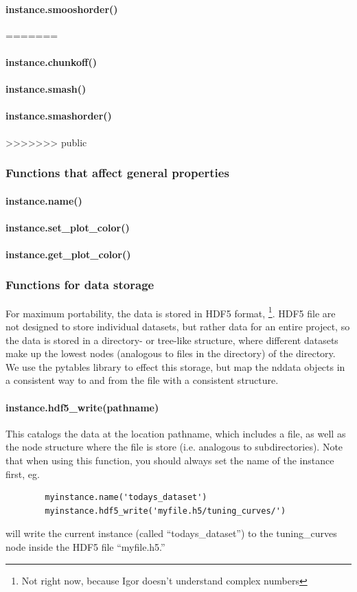 \paragraph{instance.smooshorder()}
=======
\paragraph{instance.chunkoff()}
\paragraph{instance.smash()}
\paragraph{instance.smashorder()}
>>>>>>> public
\subsubsection{Functions that affect general properties}
\paragraph{instance.name()}
\paragraph{instance.set\_plot\_color()}
\paragraph{instance.get\_plot\_color()}
\subsubsection{Functions for data storage}
For maximum portability, the data is stored in HDF5 format, \footnote{Not right now, because Igor doesn't understand complex numbers}.
HDF5 file are not designed to store individual datasets, but rather data for an entire project, so the data is stored in a directory- or tree-like structure, where different datasets make up the lowest nodes (analogous to files in the directory) of the directory. 
We use the pytables library to effect this storage, but map the nddata objects in a consistent way to and from the file with a consistent structure.
\paragraph{instance.hdf5_write(pathname)}
This catalogs the data at the location pathname,
    which includes a file, as well as the node structure
    where the file is store
    (i.e. analogous to subdirectories).
Note that when using this function,
    you should always set the name of the instance first, eg.
    \begin{lstlisting}
        myinstance.name('todays_dataset')
        myinstance.hdf5_write('myfile.h5/tuning_curves/')
    \end{lstlisting}
    will write the current instance (called ``todays\_dataset'') to
    the tuning\_curves node inside the HDF5 file ``myfile.h5.''
